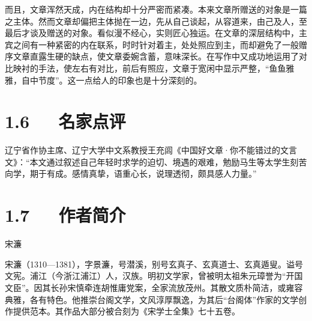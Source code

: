 \documentclass[letterpaper,10pt,english]{sphinxmanual}
\begin{document}
而且，文章浑然天成，内在结构却十分严密而紧凑。本来文章所赠送的对象是一篇之主体。然而文章却偏把主体抛在一边，先从自己谈起，从容道来，由己及人，至最后才谈及赠送的对象。看似漫不经心，实则匠心独运。在文章的深层结构中，主宾之间有一种紧密的内在联系，时时针对着主，处处照应到主，而却避免了一般赠序文章直露生硬的缺点，使文章委婉含蓄，意味深长。在写作中又成功地运用了对比映衬的手法，使左右有对比，前后有照应，文章于宽闲中显示严整，“鱼鱼雅雅，自中节度”。这一点给人的印象也是十分深刻的。


\section{1.6   名家点评}
\label{\detokenize{p01_u6563_u6587/_u5b8b_u6fc2-_u9001_u4e1c_u9633_u9a6c_u751f_u5e8f:id12}}
辽宁省作协主席、辽宁大学中文系教授王充闾《中国好文章·你不能错过的文言文》：“本文通过叙述自己年轻时求学的迫切、境遇的艰难，勉励马生等太学生刻苦向学，期于有成。感情真挚，语重心长，说理透彻，颇具感人力量。”


\section{1.7   作者简介}
\label{\detokenize{p01_u6563_u6587/_u5b8b_u6fc2-_u9001_u4e1c_u9633_u9a6c_u751f_u5e8f:id13}}
宋濂

宋濂（1310—1381），字景濂，号潜溪，别号玄真子、玄真道士、玄真遁叟。谥号文宪。浦江（今浙江浦江）人，汉族。明初文学家，曾被明太祖朱元璋誉为“开国文臣”。因其长孙宋慎牵连胡惟庸党案，全家流放茂州。其散文质朴简洁，或雍容典雅，各有特色。他推崇台阁文学，文风淳厚飘逸，为其后“台阁体”作家的文学创作提供范本。其作品大部分被合刻为《宋学士全集》七十五卷。
\end{document}

